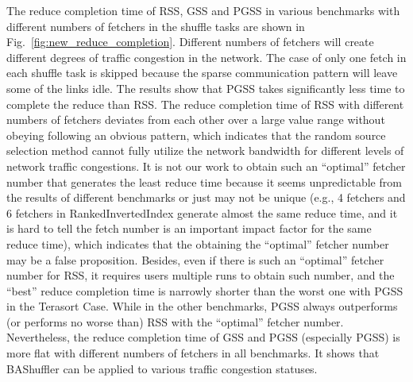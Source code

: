 \documentclass[10pt,journal,compsoc]{IEEEtran}
\begin{document}


The reduce completion time of RSS, GSS and PGSS in various benchmarks with different numbers of fetchers in the shuffle tasks are shown in Fig.~\ref{fig:new_reduce_completion}. 
Different numbers of fetchers will create different degrees of traffic
congestion in the network. 
The case of only one fetch in each shuffle task is skipped because the
sparse communication pattern will leave some of the links idle.
The results show that PGSS takes significantly less
time to complete the reduce than RSS.
The reduce completion time of RSS with different numbers of fetchers
deviates from each other over a large value range without obeying following an obvious pattern,
which indicates that the random source selection method cannot fully
utilize the network bandwidth for different levels of network traffic
congestions.
It is not our work to obtain such an ``optimal'' fetcher number that generates the least reduce time because it seems unpredictable from the results of different benchmarks or just may not be unique 
(e.g., 4 fetchers and 6 fetchers in RankedInvertedIndex generate almost the same reduce time, and it is hard to tell the fetch number is an important impact factor for the same reduce time), which indicates that the obtaining the ``optimal'' fetcher number may be a false proposition.
Besides, even if there is such an ``optimal'' fetcher number for RSS, it requires users multiple runs to obtain such number, and the ``best'' reduce completion time is narrowly shorter than the worst one with PGSS in the Terasort Case. 
While in the other benchmarks, PGSS always outperforms (or performs no worse than) RSS with the ``optimal'' fetcher number. 
Nevertheless, the reduce completion time of GSS and PGSS (especially PGSS) is more flat
with different numbers of fetchers in all benchmarks.
It shows that BAShuffler can be applied to various traffic congestion statuses.
\end{document}
